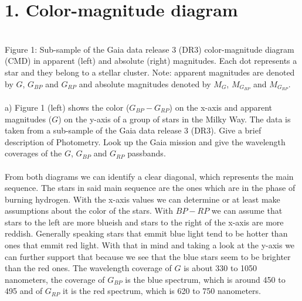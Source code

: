 \section*{1. Color-magnitude diagram}

\noindent{}\\
\noindent
Figure 1: Sub-sample of the Gaia data release 3 (DR3) color-magnitude diagram (CMD) in apparent  (left)
and absolute (right) magnitudes. Each dot represents a star and they belong to a stellar cluster. Note:
apparent magnitudes are denoted by $G$, $G_{BP}$ and $G_{RP}$ and absolute magnitudes denoted by $M_G$, 
$M_{G_{BP}}$ and $M_{G_{RP}}$.\\
\\
a) Figure 1 (left) shows the color ($G_{BP} - G_{RP}$) on the x-axis and apparent magnitudes ($G$) on the
y-axis of a group of stars in the Milky Way. The data is taken from a sub-sample of the Gaia data release
3 (DR3). Give a brief description of Photometry. Look up the Gaia mission and give the wavelength 
coverages of the $G$, $G_{BP}$ and $G_{RP}$ passbands.\\
\\
From both diagrams we can identify a clear diagonal, which represents the main sequence. The 
stars in said main sequence are the ones which are in the phase of burning hydrogen. With the x-axis 
values we can determine or at least make assumptions about the color of the stars. With $BP - RP$ we can 
assume that stars to the left are more blueish and stars to the right of the x-axis are more reddish.
Generally speaking stars that emmit blue light tend to be hotter than ones that emmit red light. With that
in mind and taking a look at the y-axis we can further support that because we see that the blue stars 
seem to be brighter than the red ones. The wavelength coverage of $G$ is about 330 to 1050 nanometers, the 
coverage of $G_{BP}$ is the blue spectrum, which is around 450 to 495 and of $G_{RP}$ it is the red 
spectrum, which is 620 to 750 nanometers.\\
